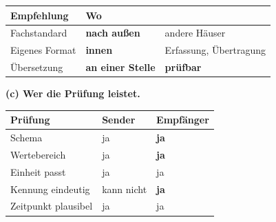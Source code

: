 \begin{aufgabe}
\begin{center}
\end{center}

\begin{center}
\renewcommand{\arraystretch}{1.45}
\begin{tabular}{@{}P{3.0cm}P{2.2cm}P{2.8cm}@{}}
\toprule
\textbf{Empfehlung} & \textbf{Wo} & \\
\midrule
Fachstandard & \textbf{nach außen} & \textcolor{gruen}{andere Häuser}\\
Eigenes Format & \textbf{innen} & \textcolor{gruen}{Erfassung, Übertragung}\\
Übersetzung & \textbf{an einer Stelle} & \textcolor{gruen}{\textbf{prüfbar}}\\
\bottomrule
\end{tabular}
\end{center}

\medskip
\textbf{(c) Wer die Prüfung leistet.}

\begin{center}
{\small
\renewcommand{\arraystretch}{1.5}
\begin{tabular}{@{}P{2.8cm}P{2.4cm}P{2.6cm}@{}}
\toprule
\textbf{Prüfung} & \textbf{Sender} & \textbf{Empfänger}\\
\midrule
Schema & \textcolor{gruen}{ja} & \textcolor{gruen}{\textbf{ja}}\\
Wertebereich & \textcolor{gruen}{ja} & \textcolor{gruen}{\textbf{ja}}\\
Einheit passt & \textcolor{gruen}{ja} & \textcolor{gruen}{ja}\\
Kennung eindeutig & \textcolor{mittel}{kann nicht} & \textcolor{gruen}{\textbf{ja}}\\
Zeitpunkt plausibel & \textcolor{gruen}{ja} & \textcolor{gruen}{ja}\\
\bottomrule
\end{tabular}}
\end{center}

\begin{center}
\begin{minipage}{0.88\textwidth}
\end{minipage}
\end{center}


\end{aufgabe}
